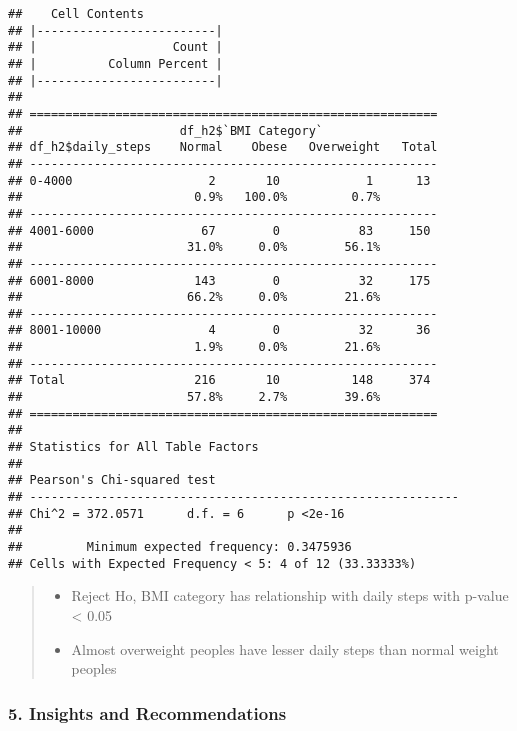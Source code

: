 \documentclass[
]{article}
\begin{document}
\begin{verbatim}
##    Cell Contents 
## |-------------------------|
## |                   Count | 
## |          Column Percent | 
## |-------------------------|
## 
## =========================================================
##                      df_h2$`BMI Category`
## df_h2$daily_steps    Normal    Obese   Overweight   Total
## ---------------------------------------------------------
## 0-4000                   2       10            1      13 
##                        0.9%   100.0%         0.7%        
## ---------------------------------------------------------
## 4001-6000               67        0           83     150 
##                       31.0%     0.0%        56.1%        
## ---------------------------------------------------------
## 6001-8000              143        0           32     175 
##                       66.2%     0.0%        21.6%        
## ---------------------------------------------------------
## 8001-10000               4        0           32      36 
##                        1.9%     0.0%        21.6%        
## ---------------------------------------------------------
## Total                  216       10          148     374 
##                       57.8%     2.7%        39.6%        
## =========================================================
## 
## Statistics for All Table Factors
## 
## Pearson's Chi-squared test 
## ------------------------------------------------------------
## Chi^2 = 372.0571      d.f. = 6      p <2e-16 
## 
##         Minimum expected frequency: 0.3475936 
## Cells with Expected Frequency < 5: 4 of 12 (33.33333%)
\end{verbatim}

\begin{quote}
\begin{itemize}
\item
  Reject Ho, BMI category has relationship with daily steps with p-value
  \textless{} 0.05
\item
  Almost overweight peoples have lesser daily steps than normal weight
  peoples
\end{itemize}
\end{quote}

\hypertarget{insights-and-recommendations}{%
\subsubsection{\texorpdfstring{\textbf{5. Insights and
Recommendations}}{5. Insights and Recommendations}}\label{insights-and-recommendations}}
\end{document}
